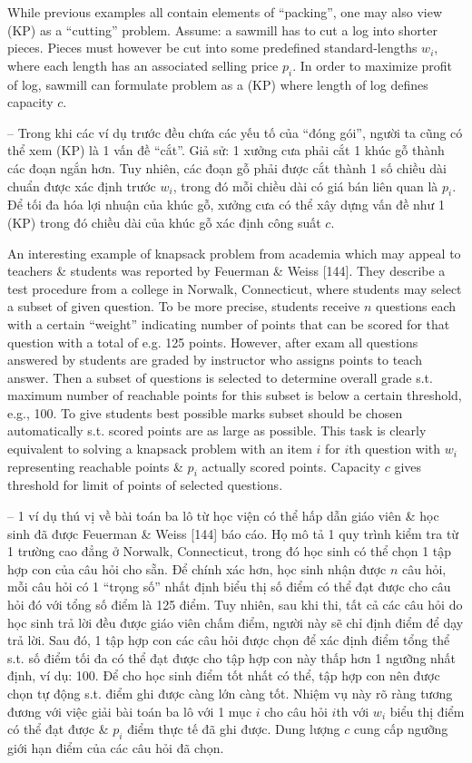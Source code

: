 \documentclass{article}
\begin{document}
\begin{itemize}
\begin{itemize}
        While previous examples all contain elements of ``packing'', one may also view (KP) as a ``cutting'' problem. Assume: a sawmill has to cut a log into shorter pieces. Pieces must however be cut into some predefined standard-lengths $w_i$, where each length has an associated selling price $p_i$. In order to maximize profit of log, sawmill can formulate problem as a (KP) where length of log defines capacity $c$.

        -- Trong khi các ví dụ trước đều chứa các yếu tố của ``đóng gói'', người ta cũng có thể xem (KP) là 1 vấn đề ``cắt''. Giả sử: 1 xưởng cưa phải cắt 1 khúc gỗ thành các đoạn ngắn hơn. Tuy nhiên, các đoạn gỗ phải được cắt thành 1 số chiều dài chuẩn được xác định trước $w_i$, trong đó mỗi chiều dài có giá bán liên quan là $p_i$. Để tối đa hóa lợi nhuận của khúc gỗ, xưởng cưa có thể xây dựng vấn đề như 1 (KP) trong đó chiều dài của khúc gỗ xác định công suất $c$.

        An interesting example of knapsack problem from academia which may appeal to teachers \& students was reported by Feuerman \& Weiss [144]. They describe a test procedure from a college in Norwalk, Connecticut, where students may select a subset of given question. To be more precise, students receive $n$ questions each with a certain ``weight'' indicating number of points that can be scored for that question with a total of e.g. 125 points. However, after exam all questions answered by students are graded by instructor who assigns points to teach answer. Then a subset of questions is selected to determine overall grade s.t. maximum number of reachable points for this subset is below a certain threshold, e.g., 100. To give students best possible marks subset should be chosen automatically s.t. scored points are as large as possible. This task is clearly equivalent to solving a knapsack problem with an item $i$ for $i$th question with $w_i$ representing reachable points \& $p_i$ actually scored points. Capacity $c$ gives threshold for limit of points of selected questions.

        -- 1 ví dụ thú vị về bài toán ba lô từ học viện có thể hấp dẫn giáo viên \& học sinh đã được Feuerman \& Weiss [144] báo cáo. Họ mô tả 1 quy trình kiểm tra từ 1 trường cao đẳng ở Norwalk, Connecticut, trong đó học sinh có thể chọn 1 tập hợp con của câu hỏi cho sẵn. Để chính xác hơn, học sinh nhận được $n$ câu hỏi, mỗi câu hỏi có 1 ``trọng số'' nhất định biểu thị số điểm có thể đạt được cho câu hỏi đó với tổng số điểm là 125 điểm. Tuy nhiên, sau khi thi, tất cả các câu hỏi do học sinh trả lời đều được giáo viên chấm điểm, người này sẽ chỉ định điểm để dạy trả lời. Sau đó, 1 tập hợp con các câu hỏi được chọn để xác định điểm tổng thể s.t. số điểm tối đa có thể đạt được cho tập hợp con này thấp hơn 1 ngưỡng nhất định, ví dụ: 100. Để cho học sinh điểm tốt nhất có thể, tập hợp con nên được chọn tự động s.t. điểm ghi được càng lớn càng tốt. Nhiệm vụ này rõ ràng tương đương với việc giải bài toán ba lô với 1 mục $i$ cho câu hỏi $i$th với $w_i$ biểu thị điểm có thể đạt được \& $p_i$ điểm thực tế đã ghi được. Dung lượng $c$ cung cấp ngưỡng giới hạn điểm của các câu hỏi đã chọn.


\end{itemize}
\end{itemize}
\end{document}
